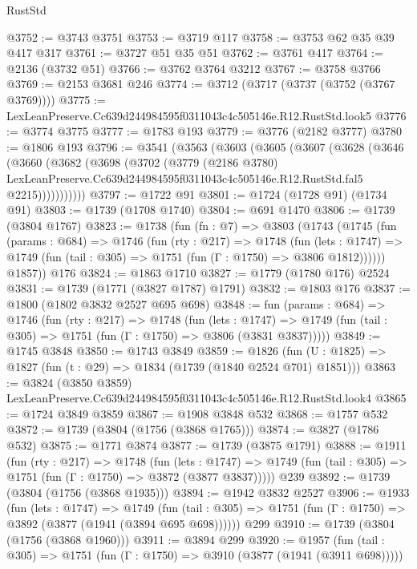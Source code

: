 \begin{lexlean}{RustStd}
\begin{coremodule}
@3752 := @3743 @3751
@3753 := @3719 @117
@3758 := @3753 @62 @35 @39 @417 @317
@3761 := @3727 @51 @35 @51
@3762 := @3761 @417
@3764 := @2136 (@3732 @51)
@3766 := @3762 @3764 @3212
@3767 := @3758 @3766
@3769 := @2153 @3681 @246
@3774 := @3712 (@3717 (@3737 (@3752 (@3767 @3769))))
@3775 := LexLeanPreserve.Cc639d244984595f0311043c4c505146e.R12.RustStd.look5
@3776 := @3774 @3775
@3777 := @1783 @193
@3779 := @3776 (@2182 @3777)
@3780 := @1806 @193
@3796 := @3541
    (@3563
      (@3603
        (@3605
          (@3607
            (@3628
              (@3646
                (@3660
                  (@3682
                    (@3698
                      (@3702
                        (@3779
                          (@2186 @3780)
                          LexLeanPreserve.Cc639d244984595f0311043c4c505146e.R12.RustStd.fal5
                          @2215)))))))))))
@3797 := @1722 @91
@3801 := @1724 (@1728 @91) (@1734 @91)
@3803 := @1739 (@1708 @1740)
@3804 := @691 @1470
@3806 := @1739 (@3804 @1767)
@3823 := @1738
    (fun (fn : @7) =>
    @3803
      (@1743
        (@1745
          (fun (params : @684) =>
          @1746
            (fun (rty : @217) =>
            @1748
              (fun (lets : @1747) =>
              @1749 (fun (tail : @305) => @1751 (fun (Γ : @1750) => @3806 @1812))))))
        @1857))
    @176
@3824 := @1863 @1710
@3827 := @1779 (@1780 @176) @2524
@3831 := @1739 (@1771 (@3827 @1787) @1791)
@3832 := @1803 @176
@3837 := @1800 (@1802 @3832 @2527 @695 @698)
@3848 := fun (params : @684) =>
  @1746
    (fun (rty : @217) =>
    @1748
      (fun (lets : @1747) =>
      @1749 (fun (tail : @305) => @1751 (fun (Γ : @1750) => @3806 (@3831 @3837)))))
@3849 := @1745 @3848
@3850 := @1743 @3849
@3859 := @1826 (fun (U : @1825) => @1827 (fun (t : @29) => @1834 (@1739 (@1840 @2524 @701) @1851)))
@3863 := @3824 (@3850 @3859) LexLeanPreserve.Cc639d244984595f0311043c4c505146e.R12.RustStd.look4
@3865 := @1724 @3849 @3859
@3867 := @1908 @3848 @532
@3868 := @1757 @532
@3872 := @1739 (@3804 (@1756 (@3868 @1765)))
@3874 := @3827 (@1786 @532)
@3875 := @1771 @3874
@3877 := @1739 (@3875 @1791)
@3888 := @1911
    (fun (rty : @217) =>
    @1748
      (fun (lets : @1747) =>
      @1749 (fun (tail : @305) => @1751 (fun (Γ : @1750) => @3872 (@3877 @3837)))))
    @239
@3892 := @1739 (@3804 (@1756 (@3868 @1935)))
@3894 := @1942 @3832 @2527
@3906 := @1933
    (fun (lets : @1747) =>
    @1749 (fun (tail : @305) => @1751 (fun (Γ : @1750) => @3892 (@3877 (@1941 (@3894 @695 @698))))))
    @299
@3910 := @1739 (@3804 (@1756 (@3868 @1960)))
@3911 := @3894 @299
@3920 := @1957
    (fun (tail : @305) => @1751 (fun (Γ : @1750) => @3910 (@3877 (@1941 (@3911 @698)))))

\end{coremodule}
\end{lexlean}
